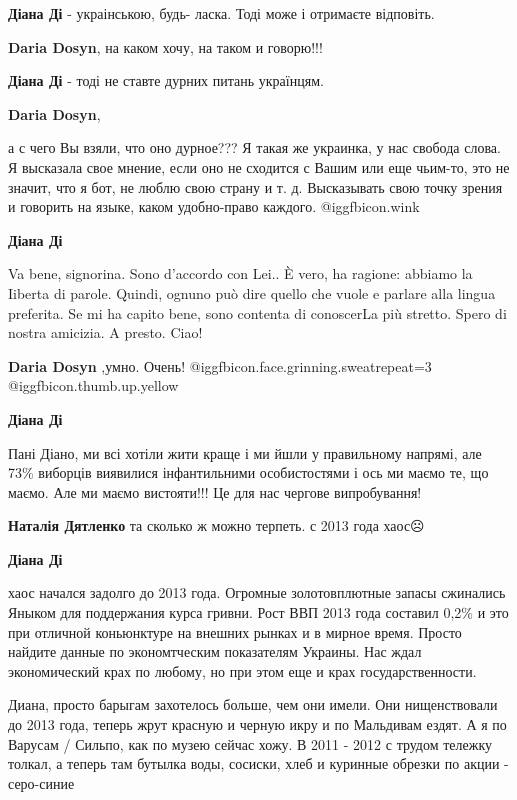 \begin{itemize} %
\textbf{Діана Ді} - украінською, будь- ласка. Тоді може і отримаєте відповіть.

\textbf{Daria Dosyn}, на каком хочу, на таком и говорю!!!

\textbf{Діана Ді} - тоді не ставте дурних питань українцям.

\textbf{Daria Dosyn}, 

а с чего Вы взяли, что оно дурное??? Я такая же украинка, у нас свобода слова. Я
высказала свое мнение, если оно не сходится с Вашим или еще чьим-то, это не
значит, что я бот, не люблю свою страну и т. д. Высказывать свою точку зрения и
говорить на языке, каком удобно-право каждого. @igg{fbicon.wink} 

\textbf{Діана Ді} 

Va bene, signorina. Sono d’accordo con Lei.. È vero, ha ragione: abbiamo la
Iiberta di parole. Quindi, ognuno può dire quello che vuole e parlare alla
lingua preferita. Se mi ha capito bene, sono contenta di conoscerLa più
stretto. Spero di nostra amicizia. A presto. Ciao!

\textbf{Daria Dosyn} ,умно. Очень! @igg{fbicon.face.grinning.sweat}{repeat=3}  @igg{fbicon.thumb.up.yellow} 

\textbf{Діана Ді} 

Пані Діано, ми всі хотіли жити краще і ми йшли у правильному напрямі, але 73\%
виборців виявилися інфантильними особистостями і ось ми маємо те, що маємо. Але
ми маємо вистояти!!! Це для нас чергове випробування!


\textbf{Наталія Дятленко} та сколько ж можно терпеть. с 2013 года хаос☹

\textbf{Діана Ді} 

хаос начался задолго до 2013 года. Огромные золотовплютные запасы сжинались
Яныком для поддержания курса гривни. Рост ВВП 2013 года составил 0,2\% и это при
отличной коньюнктуре на внешних рынках и в мирное время. Просто найдите данные
по экономтческим показателям Украины. Нас ждал экономический крах по любому, но
при этом еще и крах государственности.


Диана, просто барыгам захотелось больше, чем они имели. Они нищенствовали до
2013 года, теперь жрут красную и черную икру и по Мальдивам ездят. А я по
Варусам / Сильпо, как по музею сейчас хожу. В 2011 - 2012 с трудом тележку
толкал, а теперь там бутылка воды, сосиски, хлеб и куринные обрезки по акции -
серо-синие


\end{itemize}
